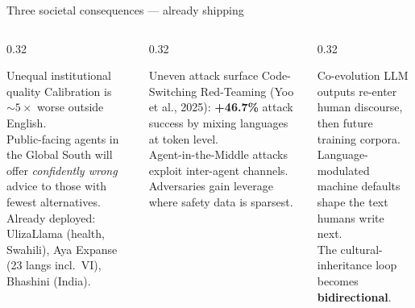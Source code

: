 \documentclass[11pt,aspectratio=169]{beamer}
\begin{document}
\begin{frame}{Three societal consequences --- already shipping}
    \large
    \begin{columns}[T]
        \begin{column}{0.32\textwidth}
            \begin{alertblock}{Unequal institutional quality}
                \footnotesize Calibration is $\sim 5\times$ worse outside English.\\[4pt]
                Public-facing agents in the Global South will offer \emph{confidently wrong} advice to those with fewest alternatives.\\[4pt]
                Already deployed: UlizaLlama (health, Swahili), Aya Expanse (23 langs incl.\ VI), Bhashini (India).
            \end{alertblock}
        \end{column}
        \begin{column}{0.32\textwidth}
            \begin{alertblock}{Uneven attack surface}
                \footnotesize Code-Switching Red-Teaming (Yoo et al., 2025): \textbf{+46.7\%} attack success by mixing languages at token level.\\[4pt]
                Agent-in-the-Middle attacks exploit inter-agent channels.\\[4pt]
                Adversaries gain leverage where safety data is sparsest.
            \end{alertblock}
        \end{column}
        \begin{column}{0.32\textwidth}
            \begin{alertblock}{Co-evolution}
                \footnotesize LLM outputs re-enter human discourse, then future training corpora.\\[4pt]
                Language-modulated machine defaults shape the text humans write next.\\[4pt]
                The cultural-inheritance loop becomes \textbf{bidirectional}.
            \end{alertblock}
        \end{column}
    \end{columns}
\end{frame}
\end{document}
